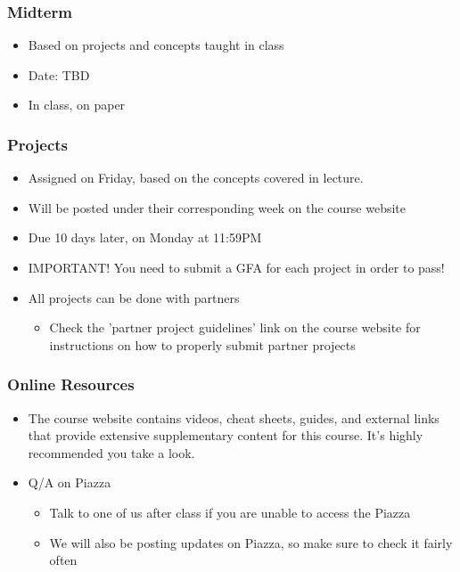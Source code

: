 \documentclass{beamer}
\begin{document}
            \begin{frame}
                \frametitle{Midterm}
                    \begin{itemize}
                        \item Based on projects and concepts taught in class
                        \item Date: TBD
                        \item In class, on paper
                    \end{itemize}
            \end{frame}
            
            \begin{frame}
                \frametitle{Projects}
                    \begin{itemize}
                        \item Assigned on Friday, based on the concepts covered in lecture.
                        \item Will be posted under their corresponding week on the course website
                        \item Due 10 days later, on Monday at 11:59PM
                        \item IMPORTANT! You need to submit a GFA for each project in order to pass!
                        \item All projects can be done with partners
                        \begin{itemize}
                            \item Check the 'partner project guidelines' link on the course website for instructions on how to properly submit partner projects
                        \end{itemize}
                        
                    \end{itemize}
            \end{frame}
            
            \begin{frame}
                \frametitle{Online Resources}
                    \begin{itemize}
                        \item The course website contains videos, cheat sheets, guides, and external links that provide extensive supplementary content for this course. It's highly recommended you take a look.
                        \item Q/A on Piazza
                            \begin{itemize}
                                \item Talk to one of us after class if you are unable to access the Piazza
                                \item We will also be posting updates on Piazza, so make sure to check it fairly often
                            \end{itemize}
                    \end{itemize}
            \end{frame}
            
            
    
    
\end{document}
